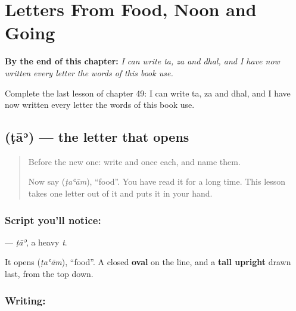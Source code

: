 
\chapter{Letters From Food, Noon and Going}
\label{ch:ar-letters-from-food-noon-going}

\begin{chapteropening}
\textbf{By the end of this chapter:} \emph{I can write ta, za and dhal, and I have now written every letter the words of this book use.}

Complete the last lesson of chapter 49: I can write ta, za and dhal, and I have now written every letter the words of this book use.
\end{chapteropening}

\section[\texorpdfstring{\ar{ط} (ṭāʾ)}{ط (ṭāʾ)}]{ (ṭāʾ) — the letter that opens }

\label{lesson:AR-W49-ta-emphatic}



\begin{quote}
Before the new one: write  and  once each, and name them.

Now say \textbf{} (\emph{ṭaʿām}), \textquotedblleft{}food\textquotedblright{}. You have read it for a long time. This lesson takes one letter out of it and puts it in your hand.
\end{quote}

\subsection*{Script you'll notice: }
\textbf{} — \emph{ṭāʾ}, a heavy \emph{t}.

It opens \textbf{} (\emph{ṭaʿām}), \textquotedblleft{}food\textquotedblright{}. A closed \textbf{oval} on the line, and a \textbf{tall upright} drawn last, from the top down.

\subsection*{Writing: }

